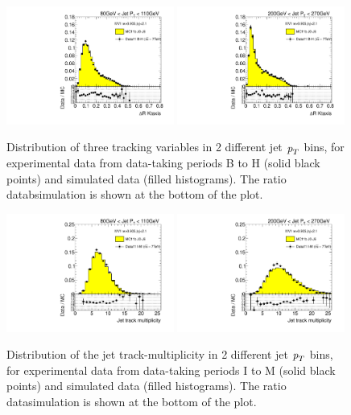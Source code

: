 \begin{figure}[tp]
\includegraphics[width=0.49\textwidth]{FIGS/dataMC/VarDRktaxisPT080.pdf}
\includegraphics[width=0.49\textwidth]{FIGS/dataMC/VarDRktaxisPT200.pdf}  
\caption{ Distribution of three tracking variables in 2 different jet ${\emph{p}_{T}}$ bins, for experimental data from data-taking periods B to H (solid black points) and simulated data (filled histograms). The ratio datab\/simulation is shown at the bottom of the plot.}
\label{fig:datamcinputvars}
\end{figure}


\begin{figure}[tp]
\centering
\includegraphics[width=0.49\textwidth]{FIGS/dataMCItoM/VarNtrkPT080.pdf}
\includegraphics[width=0.49\textwidth]{FIGS/dataMCItoM/VarNtrkPT200.pdf}
\caption{ Distribution of the jet track-multiplicity in 2 different jet ${\emph{p}_{T}}$ bins, for experimental data from data-taking periods I to M (solid black points) and simulated data (filled histograms). The ratio data\/simulation is shown at the bottom of the plot.}
\label{fig:datamcinputvarsItoM}
\end{figure}



